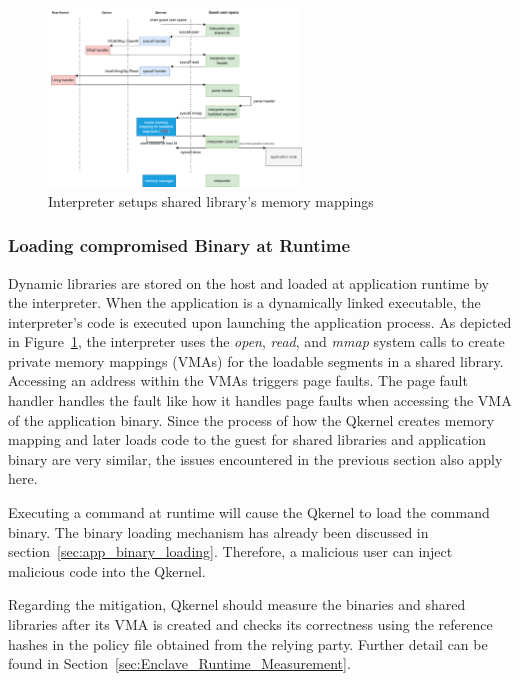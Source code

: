 \begin{figure}[htp]
  \centering
  \includegraphics[width=0.6\textwidth]{images/load_shared_libarart.png}
  \caption[Interpreter setups shared library's memory mappings]{Interpreter setups shared library's memory mappings}
  \label{fig:load_shared_libarart}
\end{figure}


\subsubsection{Loading compromised Binary at Runtime}
Dynamic libraries are stored on the host and loaded at application runtime by the interpreter. When the application is a dynamically linked executable, the interpreter's code is executed upon launching the application process. As depicted in Figure~\ref{fig:load_shared_libarart}, the interpreter uses the \emph{open}, \emph{read}, and \emph{mmap} 
system calls to create private memory mappings (\acrshort{VMA}s) for the loadable segments in a shared library. Accessing an address within the \acrshort{VMA}s triggers page faults. The page fault handler handles the fault like how it handles page faults when accessing the \acrshort{VMA} of the application binary.
Since the process of how the Qkernel creates memory mapping and later loads code to the guest for shared libraries and application binary are very similar, the issues encountered in the previous section also apply here. 
 
Executing a command at runtime will cause the Qkernel to load the command binary. The binary loading mechanism has already been discussed in section~\ref{sec:app_binary_loading}. Therefore, a malicious user can inject malicious code into the Qkernel. 
 
Regarding the mitigation, Qkernel should measure the binaries and shared libraries after its \acrshort{VMA} is created and checks its correctness using the reference hashes in the policy file obtained from the relying party. Further detail can be found in Section~\ref{sec:Enclave_Runtime_Measurement}. 


